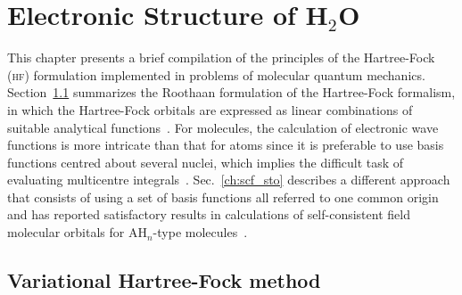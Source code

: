\chapter{Electronic Structure of H$_{2}$O}
\label{cha:scf_h2o}





This chapter presents a brief compilation of the principles of the
Hartree-Fock (\textsc{hf}) formulation implemented in problems of
molecular quantum mechanics. Section~\ref{ch:var_hf} summarizes the
Roothaan formulation of the Hartree-Fock formalism, in which the
Hartree-Fock orbitals are expressed as linear combinations of suitable
analytical functions~\cite{Roothaan_HF}. For molecules, the
calculation of electronic wave functions is more intricate than that
for atoms since it is preferable to use basis functions centred about
several nuclei, which implies the difficult task of evaluating
multicentre
integrals~\cite{Pitzer_1968,Pitzer_1970}. Sec.~\ref{ch:scf_sto}
describes a different approach that consists of using a set of basis
functions all referred to one common origin and has reported
satisfactory results in calculations of self-consistent field
molecular orbitals for AH$_{n}$-type molecules~\cite{Moccia_JCP_2164,
  Moccia_1964}.


\section{Variational Hartree-Fock method}
\label{ch:var_hf}





